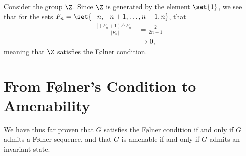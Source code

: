 \begin{example}
  Consider the group $\Z$. Since $\Z$ is generated by the element $\set{1}$, we see that for the sets $F_n = \set{-n,-n+1,\dots,n-1,n}$, that
  \begin{align*}
    \frac{\left\vert \left(F_n + 1\right)\triangle F_n \right\vert}{\left\vert F_n \right\vert} &= \frac{2}{2n+1}\\
                                                                                                &\rightarrow 0,
  \end{align*}
  meaning that $\Z$ satisfies the Følner condition.
\end{example}
\section{From Følner's Condition to Amenability}\label{sec:approximate_means}%
We have thus far proven that $G$ satisfies the Følner condition if and only if $G$ admits a Følner sequence, and that $G$ is amenable if and only if $G$ admits an invariant state.\newline


